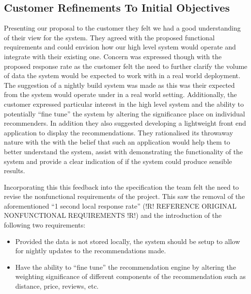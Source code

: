 \documentclass{l3proj}
\begin{document}

\subsection{Customer Refinements To Initial Objectives}
\label{sec:custrefineinitobj}

Presenting our proposal to the customer they felt we had a good understanding of their view for the system. They agreed with the proposed functional requirements and could envision how our high level system would operate and integrate with their existing one. Concern was expressed though with the proposed response rate as the customer felt the need to further clarify the volume of data the system would be expected to work with in a real world deployment. The suggestion of a nightly build system was made as this was their expected from the system would operate under in a real world setting. Additionally, the customer expressed particular interest in the high level system and the ability to potentially “fine tune” the system by altering the significance place on individual recommenders. In addition they also suggested developing a lightweight front end application to display the recommendations. They rationalised its throwaway nature with the with the belief that such an application would help them to better understand the system, assist with demonstrating the functionality of the system and provide a clear indication of if the system could produce sensible results. 

Incorporating this this feedback into the specification  the team felt the need to revise the nonfunctional requirements of the project. This saw the removal of the aforementioned “1 second local response rate” (!R! REFERENCE ORIGINAL NONFUNCTIONAL REQUIREMENTS !R!) and the introduction of the following two requirements:

\begin{itemize}
\item Provided the data is not stored locally, the system should be setup to allow for nightly updates to the recommendations made.
\item Have the ability to “fine tune” the recommendation engine by altering the weighting significance of different components of the recommendation such as distance, price, 
reviews, etc.
\end{itemize}
\end{document}
